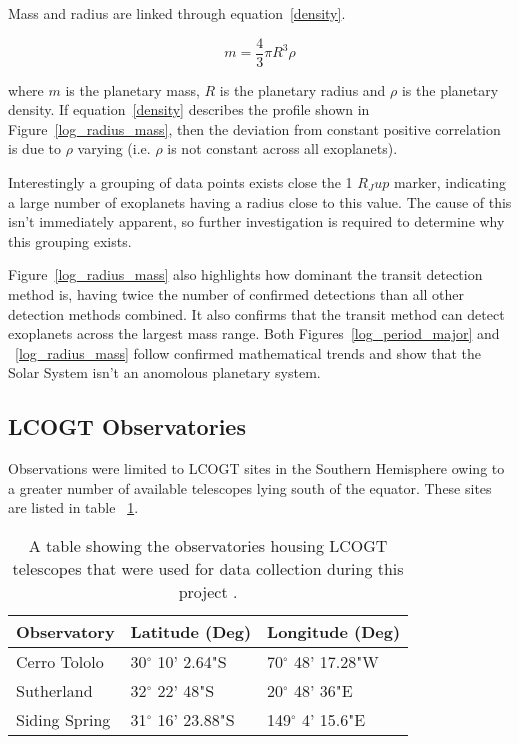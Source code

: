 \documentclass{article}
\begin{document}
Mass and radius are linked through equation~\ref{density}. 

\begin{equation} \label{density}
    m = \frac{4}{3}\pi R^3 \rho
\end{equation}

 where $m$ is the planetary mass, $R$ is the planetary radius and $\rho$ is the planetary density. If equation~\ref{density} describes the profile shown in Figure~\ref{log_radius_mass}, then the deviation from constant positive correlation is due to $\rho$ varying (i.e. $\rho$ is not constant across all exoplanets). 

 Interestingly a grouping of data points exists close the 1 $R_Jup$ marker, indicating a large number of exoplanets having a radius close to this value. The cause of this isn't immediately apparent, so further investigation is required to determine why this grouping exists.

 Figure~\ref{log_radius_mass} also highlights how dominant the transit detection method is, having twice the number of confirmed detections than all other detection methods combined. It also confirms that the transit method can detect exoplanets across the largest mass range. Both Figures~\ref{log_period_major} and ~\ref{log_radius_mass} follow confirmed mathematical trends and show that the Solar System isn't an anomolous planetary system. 


\subsection{LCOGT Observatories}
Observations were limited to LCOGT sites in the Southern Hemisphere owing to a greater number of available telescopes lying south of the equator. These sites are listed in table ~\ref{observatory}.

\begin{table}
    \centering
    \begin{tabular}{ | l | l | l | }
    \hline \hline
    Observatory & Latitude (Deg) & Longitude (Deg)       \\ \hline \hline
    Cerro Tololo    & 30$^\circ$ 10' 2.64"S & 70$^\circ$ 48' 17.28"W  \\
    Sutherland   & 32$^\circ$ 22' 48"S & 20$^\circ$ 48' 36"E  \\
    Siding Spring  & 31$^\circ$ 16' 23.88"S & 149$^\circ$ 4' 15.6"E \\
    \hline
    \end{tabular}
    \caption{A table showing the observatories housing LCOGT telescopes that were used for data collection during this project \parencite{sites}.}
    \label{observatory}
\end{table}
\end{document}

